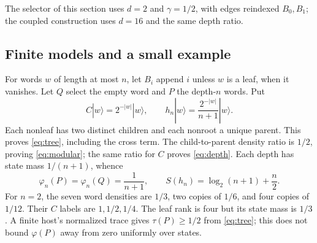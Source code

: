 The selector of this section uses $d=2$ and $\gamma=1/2$, with edges reindexed $B_0,B_1$; the coupled construction uses $d=16$ and the same depth ratio.

\subsection{Finite models and a small example}
For words $w$ of length at most $n$, let $B_i$ append $i$ unless $w$ is a leaf, when it vanishes. Let $Q$ select the empty word and $P$ the depth-$n$ words. Put
\begin{equation}\label{eq:treeh}
 C|w\rangle=2^{-|w|}|w\rangle,\qquad
 h_n|w\rangle=\frac{2^{-|w|}}{n+1}|w\rangle.
\end{equation}
Each nonleaf has two distinct children and each nonroot a unique parent. This proves \eqref{eq:tree}, including the cross term. The child-to-parent density ratio is $1/2$, proving \eqref{eq:modular}; the same ratio for $C$ proves \eqref{eq:depth}. Each depth has state mass $1/(n+1)$, whence
\begin{equation}\label{eq:treeentropy}
 \varphi_n(P)=\varphi_n(Q)=\frac1{n+1},\qquad
 S(h_n)=\log_2(n+1)+\frac n2.
\end{equation}
For $n=2$, the seven word densities are $1/3$, two copies of $1/6$, and four copies of $1/12$. Their $C$ labels are $1,1/2,1/4$. The leaf rank is four but its state mass is $1/3$. A finite host's normalized trace gives $\tau(P)\geq1/2$ from \eqref{eq:tree}; this does not bound $\varphi(P)$ away from zero uniformly over states.

